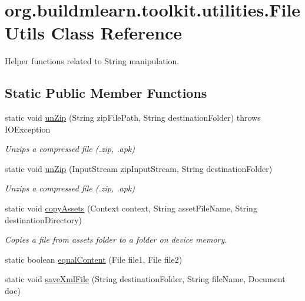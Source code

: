 \hypertarget{classorg_1_1buildmlearn_1_1toolkit_1_1utilities_1_1FileUtils}{}\section{org.\+buildmlearn.\+toolkit.\+utilities.\+File\+Utils Class Reference}
\label{classorg_1_1buildmlearn_1_1toolkit_1_1utilities_1_1FileUtils}


Helper functions related to String manipulation.  


\subsection*{Static Public Member Functions}
\begin{DoxyCompactItemize}
\item 
static void \hyperlink{classorg_1_1buildmlearn_1_1toolkit_1_1utilities_1_1FileUtils_a3985505c7367639777e7829b87fa625b}{un\+Zip} (String zip\+File\+Path, String destination\+Folder)  throws I\+O\+Exception 
\begin{DoxyCompactList}\small\item\em Unzips a compressed file (.zip, .apk) \end{DoxyCompactList}\item 
static void \hyperlink{classorg_1_1buildmlearn_1_1toolkit_1_1utilities_1_1FileUtils_a967a428caedce18e005b27539c0beb67}{un\+Zip} (Input\+Stream zip\+Input\+Stream, String destination\+Folder)
\begin{DoxyCompactList}\small\item\em Unzips a compressed file (.zip, .apk) \end{DoxyCompactList}\item 
static void \hyperlink{classorg_1_1buildmlearn_1_1toolkit_1_1utilities_1_1FileUtils_a40211ea6f81fcdd275cb33047c67c01a}{copy\+Assets} (Context context, String asset\+File\+Name, String destination\+Directory)
\begin{DoxyCompactList}\small\item\em Copies a file from assets folder to a folder on device memory. \end{DoxyCompactList}\item 
static boolean \hyperlink{classorg_1_1buildmlearn_1_1toolkit_1_1utilities_1_1FileUtils_ae132c7d141598ae38e46d7229bccdb42}{equal\+Content} (File file1, File file2)
\item 
static void \hyperlink{classorg_1_1buildmlearn_1_1toolkit_1_1utilities_1_1FileUtils_add3d6116d25e4279692f34bc9cb237db}{save\+Xml\+File} (String destination\+Folder, String file\+Name, Document doc)

\end{DoxyCompactItemize}
